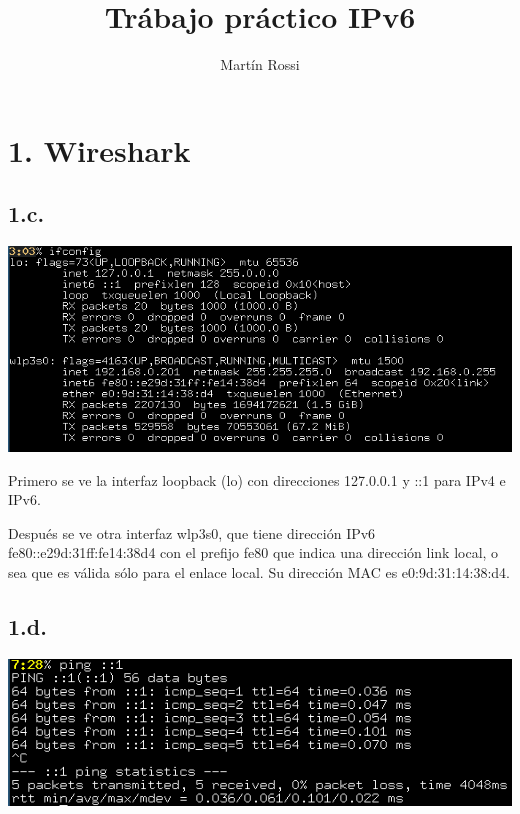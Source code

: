 \documentclass[11pt]{article}
\author{Martín Rossi}
\date{}
\title{Trábajo práctico IPv6}
\begin{document}
\maketitle
\section*{1. Wireshark}
\label{sec:orgae3beb9}
\subsection*{1.c.}
\label{sec:org7ef75ed}
\begin{center}
\includegraphics[width=.9\linewidth]{./1c.png}
\end{center}

Primero se ve la interfaz loopback (lo) con direcciones 127.0.0.1 y ::1 para IPv4 e IPv6.

Después se ve otra interfaz wlp3s0, que tiene dirección IPv6 fe80::e29d:31ff:fe14:38d4 con el prefijo fe80 que indica una dirección link local, o sea que es válida sólo para el enlace local. Su dirección MAC es e0:9d:31:14:38:d4.
\subsection*{1.d.}
\label{sec:orgf538e9d}
\begin{center}
\includegraphics[width=.9\linewidth]{./1d.png}
\end{center}
\newpage
\end{document}
